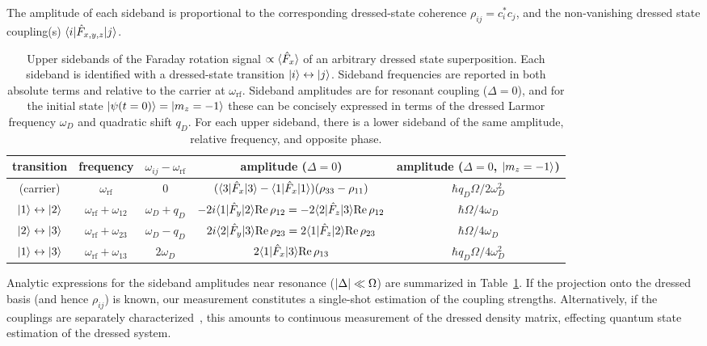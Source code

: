 \documentclass[aps,prl,reprint,superscriptaddress,floatfix]{revtex4-1}
\begin{document}
The amplitude of each sideband is proportional to the corresponding dressed-state coherence $\rho_{ij} = c_i^* c_j $, and the non-vanishing dressed state coupling(s) $\langle i \vert  \hat{F}_{x,y,z} \vert j \rangle $.
\begin{table*}[t]
    \caption{Upper sidebands of the Faraday rotation signal $\propto \langle \hat{F}_x \rangle$ of an arbitrary dressed state superposition.
    Each sideband is identified with a dressed-state transition $\vert i \rangle  \leftrightarrow \vert j \rangle $.
    Sideband frequencies are reported in both absolute terms and relative to the carrier at $\omega_{\text{rf}}$.
    Sideband amplitudes are for resonant coupling ($\Delta = 0$), and
    for the initial state $\vert \psi(t=0) \rangle =\vert m_z=-1 \rangle $ these can be concisely expressed in terms of the dressed Larmor frequency $\omega_D$ and quadratic shift $q_D$.
    For each upper sideband, there is a lower sideband of the same amplitude, relative frequency, and opposite phase.
    \label{tab:sidebands}
    }
    \begin{ruledtabular}
    \begin{tabular}{ccccc}
    transition & frequency & $\omega_{ij} - \omega_{\text{rf}}$ & amplitude ($\Delta = 0$) & amplitude ($\Delta = 0$, $\vert m_z=-1 \rangle $) \\ \hline
     (carrier) & $\omega_{\text{rf}}$ & 0 & $(\langle 3 \vert  \hat{F}_x \vert 3 \rangle  - \langle 1 \vert  \hat{F}_x \vert 1 \rangle ) (\rho_{33} - \rho_{11})$  & $\hbar q_D \Omega/2 \omega_D^2$ \\
     $\vert 1 \rangle  \leftrightarrow \vert 2 \rangle $ & $\omega_{\text{rf}} + \omega_{12}$ & $\omega_D+q_D$ & $-2i \langle 1 \vert  \hat{F}_y \vert 2 \rangle  \text{Re}\,\rho_{12} = -2 \langle 2 \vert  \hat{F}_z \vert 3 \rangle  \text{Re}\,\rho_{12}$ & $\hbar \Omega/4 \omega_D$ \\
     $\vert 2 \rangle  \leftrightarrow \vert 3 \rangle $ & $\omega_{\text{rf}} + \omega_{23}$ & $\omega_D-q_D$ & $2i \langle 2 \vert  \hat{F}_y \vert 3 \rangle  \text{Re}\,\rho_{23} = 2 \langle 1 \vert  \hat{F}_z \vert 2 \rangle  \text{Re}\,\rho_{23}$ & $\hbar \Omega/4 \omega_D$ \\
     $\vert 1 \rangle  \leftrightarrow \vert 3 \rangle $ & $\omega_{\text{rf}} + \omega_{13}$ & $2\omega_D$ & $2 \langle 1 \vert  \hat{F}_x \vert 3 \rangle  \text{Re}\,\rho_{13}$ & $\hbar q_D \Omega/4 \omega_D^2$
    \end{tabular}
    \end{ruledtabular}
\end{table*}
Analytic expressions for the sideband amplitudes near resonance ($\vert \Delta \vert  \ll \Omega$) are summarized in Table~\ref{tab:sidebands}.
If the projection onto the dressed basis (and hence $\rho_{ij}$) is known, our measurement constitutes a single-shot estimation of the coupling strengths.  
Alternatively, if the couplings are separately characterized~\cite{dimitris_synthetic_2017}, this amounts to continuous measurement of the dressed density matrix, effecting quantum state estimation of the dressed system.
\end{document}
